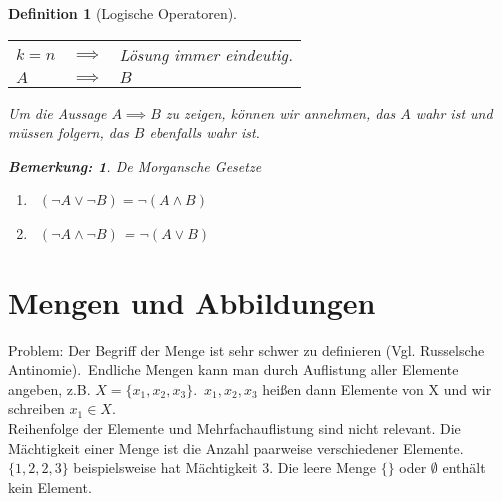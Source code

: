\documentclass{report}
\newcommand{\IN}[1]{\index{#1|BH}}
\theoremstyle{customrem}
\newtheorem*{bemerkung}{Bemerkung\textnormal:}
\theoremstyle{customdef}
\newtheorem{definition}{Definition}[chapter]
\begin{document}
\begin{definition}[Logische Operatoren]
		\begin{center}
			\begin{tabular}{l c l}
				\(k = n\) & \(\implies\) & Lösung immer eindeutig.\\
				\(A\) & \(\implies\) &  \(B\)\\
			\end{tabular}
		\end{center}
		Um die Aussage \(A \implies B\) zu zeigen, können wir annehmen, das \(A\) wahr ist und müssen folgern, das \(B\) ebenfalls wahr ist.\\
		\begin{bemerkung} De Morgansche Gesetze
			\begin{enumerate}
				\item\ \((\neg A \lor \neg B) = \neg (A \land B)\)
				\item\ \((\neg A \land \neg B)\) = \(\neg (A \lor B)\)
			\end{enumerate}
		\end{bemerkung}
	\end{definition}
	
	
	\section{Mengen und Abbildungen}
	\IN{Menge}
	Problem: Der Begriff der Menge ist sehr schwer zu definieren (Vgl. Russelsche Antinomie).\
	Endliche Mengen kann man durch Auflistung aller Elemente angeben, z.B. \(X = \{x_1, x_2, x_3\}\).\ \(x_1, x_2, x_3\) heißen dann Elemente von X und wir schreiben \(x_1 \in X\).\\
	Reihenfolge der Elemente und Mehrfachauflistung sind nicht relevant. Die Mächtigkeit einer Menge ist die Anzahl paarweise verschiedener Elemente. \(\{1, 2, 2, 3\}\) beispielsweise hat Mächtigkeit \(3\).
	Die leere Menge \(\{\}\) oder \(\emptyset\) enthält kein Element.
	
\end{document}
